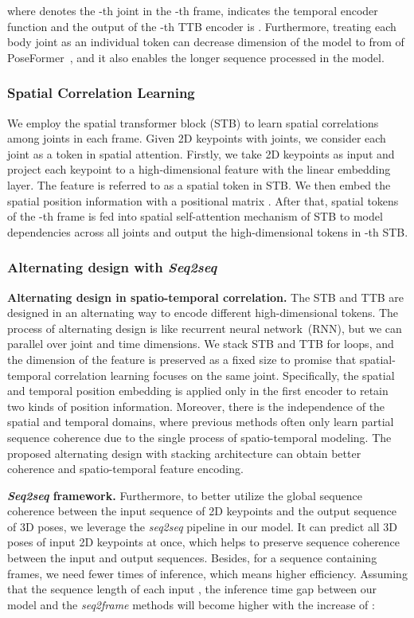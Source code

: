 \documentclass[10pt,twocolumn,letterpaper]{article}
\begin{document}
	where  denotes the -th joint in the -th frame,  indicates the temporal encoder function and the output of the -th TTB encoder is .
	Furthermore, treating each body joint as an individual token can decrease dimension of the model to  from  of PoseFormer~\cite{poseformer}, and it also enables the longer sequence processed in the model.




\subsubsection{Spatial Correlation Learning}
	We employ the spatial transformer block (STB) to learn spatial correlations among joints in each frame.
	Given 2D keypoints with  joints, we consider each joint as a token in spatial attention.
	Firstly, we take 2D keypoints as input and project each keypoint to a high-dimensional feature with the linear embedding layer. 
	The feature is referred to as a spatial token in STB.
	We then embed the spatial position information with a positional matrix .
	After that, spatial tokens  of the -th frame is fed into spatial self-attention mechanism of STB to model dependencies across all joints and output the high-dimensional tokens  in -th STB.
	
	\subsubsection{Alternating design with \textit{Seq2seq}}
\textbf{Alternating design in spatio-temporal correlation.}
	The STB and TTB are designed in an alternating way to encode different high-dimensional tokens.
	The process of alternating design is like recurrent neural network~(RNN), but we can parallel over joint and time dimensions.
	We stack STB and TTB for  loops, and the dimension of the feature is preserved as a fixed size  to promise that spatial-temporal correlation learning focuses on the same joint.
	Specifically, the spatial and temporal position embedding is applied only in the first encoder to retain two kinds of position information. 
	Moreover, there is the independence of the spatial and temporal domains, where previous methods often only learn partial sequence coherence due to the single process of spatio-temporal modeling.
	The proposed alternating design with stacking architecture can obtain better coherence and spatio-temporal feature encoding.
	
	\noindent \textbf{\textit{Seq2seq} framework.}
	Furthermore, to better utilize the global sequence coherence between the input sequence of 2D keypoints and the output sequence of 3D poses, we leverage the \textit{seq2seq} pipeline in our model.
It can predict all 3D poses of input 2D keypoints at once, which helps to preserve sequence coherence between the input and output sequences.
	Besides, for a sequence containing  frames, we need fewer times of inference, which means higher efficiency.
	Assuming that the sequence length of each input , the inference time gap  between our model and the \textit{seq2frame} methods will become higher with the increase of :
	
\end{document}
